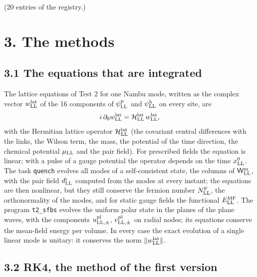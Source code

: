 \documentclass[
  10pt,
]{article}
\begin{document}
(20 entries of the registry.)

\hypertarget{the-methods}{%
\section{3. The methods}\label{the-methods}}

\hypertarget{the-equations-that-are-integrated}{%
\subsection{3.1 The equations that are
integrated}\label{the-equations-that-are-integrated}}

The lattice equations of Test 2 for one Nambu mode, written as the
complex vector \(w^{\rm lat}_{\rm LL}\) of the 16 components of
\(\psi^{\rm p}_{\rm LL}\) and \(\psi^{\rm h}_{\rm LL}\) on every site,
are
\[i\,\partial_0w^{\rm lat}_{\rm LL}=\mathcal H^{\rm lat}_{\rm LL}\,w^{\rm lat}_{\rm LL},\]
with the Hermitian lattice operator \(\mathcal H^{\rm lat}_{\rm LL}\)
(the covariant central differences with the links, the Wilson term, the
mass, the potential of the time direction, the chemical potential
\(\mu_{\rm LL}\) and the pair field). For prescribed fields the equation
is linear; with a pulse of a gauge potential the operator depends on the
time \(x^0_{\rm LL}\). The task \texttt{quench} evolves all modes of a
self-consistent state, the columns of \(\mathsf W^{\rm m}_{\rm LL}\),
with the pair field \(d^\iota_{\rm LL}\) computed from the modes at
every instant; the equations are then nonlinear, but they still conserve
the fermion number \(N^{\rm F}_{\rm LL}\), the orthonormality of the
modes, and for static gauge fields the functional
\(E^{\rm MF}_{\rm LL}\). The program \texttt{t2\_sfbs} evolves the
uniform polar state in the planes of the plane waves, with the
components \(u^{\rm pl}_{{\rm LL},\pm}\), \(v^{\rm pl}_{{\rm LL},\pm}\)
on radial nodes; its equations conserve the mean-field energy per
volume. In every case the exact evolution of a single linear mode is
unitary: it conserves the norm \(\lVert w^{\rm lat}_{\rm LL}\rVert\).

\hypertarget{rk4-the-method-of-the-first-version}{%
\subsection{3.2 RK4, the method of the first
version}\label{rk4-the-method-of-the-first-version}}
\end{document}
